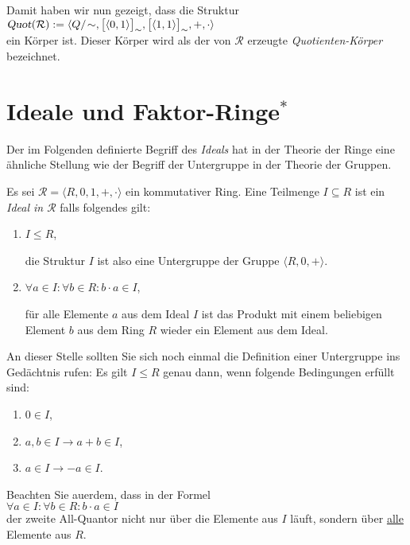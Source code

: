 Damit haben wir nun gezeigt, dass die Struktur
\\[0.2cm]
\hspace*{1.3cm}
$\textsl{Quot}(\mathcal{R}) := \langle Q/\!\sim, \bpr(0,1), \bpr(1,1), +, \cdot \rangle$ 
\\[0.2cm]
ein K\"{o}rper ist.  Dieser K\"{o}rper wird als der von $\mathcal{R}$ erzeugte \emph{\color{blue}Quotienten-K\"{o}rper} bezeichnet.


\section{Ideale und Faktor-Ringe$^*$}
Der im Folgenden definierte Begriff des \emph{Ideals} hat in der Theorie der Ringe eine \"{a}hnliche
Stellung wie der Begriff der Untergruppe in der Theorie der Gruppen.
\begin{Definition}[Ideal]
Es sei $\mathcal{R} = \langle R, 0, 1, +, \cdot \rangle$ ein kommutativer Ring.
Eine Teilmenge $I \subseteq R$ ist ein {\color{blue}\emph{Ideal in $\mathcal{R}$}} falls folgendes gilt:
\begin{enumerate}
\item $I \leq R$,

      die Struktur $I$ ist also eine Untergruppe der Gruppe $\langle R, 0, + \rangle$.
\item $\forall a \in I: \forall b \in R: b \cdot a \in I$,

      f\"{u}r alle Elemente $a$ aus dem Ideal $I$ ist das Produkt mit einem beliebigen Element
      $b$ aus dem Ring $R$ wieder ein Element aus dem Ideal. \eoxs
\end{enumerate}
\end{Definition}

\remark
An dieser Stelle sollten Sie sich noch einmal die Definition einer Untergruppe ins
Ged\"{a}chtnis rufen:  Es gilt $I \leq R$ genau
dann, wenn folgende Bedingungen erf\"{u}llt sind:
\begin{enumerate}
\item $0 \in I$,
\item $a,b \in I \rightarrow a + b \in I$,
\item $a \in I \rightarrow -a \in I$.
\end{enumerate}
Beachten Sie au\3erdem, dass in der Formel 
\\[0.2cm]
\hspace*{1.3cm}
$\forall a \in I: \forall b \in R: b \cdot a \in I$
\\[0.2cm]
der zweite All-Quantor nicht nur \"{u}ber die Elemente aus $I$ l\"{a}uft, sondern \"{u}ber
\underline{\color{red}alle} Elemente aus $R$.  \eoxs

